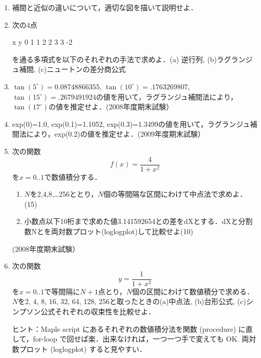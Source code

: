 \begin{enumerate}
\item 補間と近似の違いについて，適切な図を描いて説明せよ．
\item 次の4点
\begin{MapleInput}
x y 
0 1 
1 2
2 3
3 -2
\end{MapleInput}
を通る多項式を以下のそれぞれの手法で求めよ．(a) 逆行列, (b)ラグランジュ補間, (c)ニュートンの差分商公式　
\item
$\tan(5^\circ)=0.08748866355$, 
$\tan(10^\circ)=.1763269807$,
$\tan(15^\circ)=.2679491924$の値を用いて，ラグランジュ補間法により，$\tan(17^\circ)$の値を推定せよ．(2008年度期末試験）
\item exp(0)=1.0, exp(0.1)=1.1052, exp(0.3)=1.3499の値を用いて，ラグランジュ補間法により，exp(0.2)の値を推定せよ．(2009年度期末試験）
\item 次の関数
\begin{equation*}
f(x) = \frac{4}{1+x^2}
\end{equation*}
を$x = 0..1$で数値積分する．
\begin{enumerate}
\item $N$を2,4,8,…256ととり，$N$個の等間隔な区間にわけて中点法で求めよ．(15)
\item 小数点以下10桁まで求めた値3.141592654との差をdXとする．dXと分割数Nとを両対数プロット(loglogplot)して比較せよ(10)
\end{enumerate}
(2008年度期末試験）
\item 次の関数
\begin{equation*}
y = \frac{1}{1+x^2}
\end{equation*}
を$x = 0..1$で等間隔に$N+1$点とり，$N$個の区間にわけて数値積分で求める．$N$を2, 4, 8, 16, 32, 64, 128, 256と取ったときの(a)中点法, (b)台形公式, (c)シンプソン公式それぞれの収束性を比較せよ．

ヒント：Maple script にあるそれぞれの数値積分法を関数 (procedure) に直して，for-loop
で回せば楽．出来なければ，一つ一つ手で変えても OK. 両対数プロット (loglogplot) すると見やすい．
\end{enumerate}